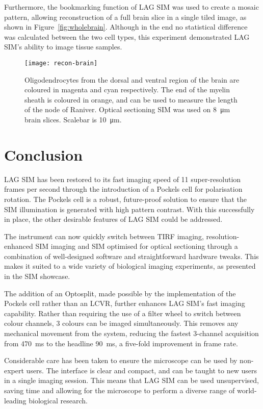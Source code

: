 Furthermore, the bookmarking function of LAG SIM was used to create a mosaic pattern, allowing reconstruction of a full brain slice in a single tiled image, as shown in Figure~\ref{fig:wholebrain}. 
Although in the end no statistical difference was calculated between the two cell types, this experiment demonstrated LAG SIM's ability to image tissue samples. 

\begin{figure}[tbp!]
\centering
\texttt{[image: recon-brain]}
\caption[LAG SIM: Multi-colour optical sectioning SIM to measure the node of Raniver]{Oligodendrocytes from the dorsal and ventral region of the brain are coloured in magenta and cyan respectively. The end of the myelin sheath is coloured in orange, and can be used to measure the length of the node of Raniver. Optical sectioning SIM was used on \SI{8}{\micro\metre} brain slices. Scalebar is \SI{10}{\micro\metre}. }
\label{fig:recon-brain}
\end{figure}

\section{Conclusion}
LAG SIM has been restored to its fast imaging speed of 11 super-resolution frames per second through the introduction of a Pockels cell for polarisation rotation. 
The Pockels cell is a robust, future-proof solution to ensure that the SIM illumination is generated with high pattern contrast. 
With this successfully in place, the other desirable features of LAG SIM could be addressed. 

The instrument can now quickly switch between TIRF imaging, resolution-enhanced SIM imaging and SIM optimised for optical sectioning through a combination of well-designed software and straightforward hardware tweaks. 
This makes it suited to a wide variety of biological imaging experiments, as presented in the SIM showcase. 

The addition of an Optosplit, made possible by the implementation of the Pockels cell rather than an LCVR, further enhances LAG SIM's fast imaging capability. 
Rather than requiring the use of a filter wheel to switch between colour channels, 3 colours can be imaged simultaneously. 
This removes any mechanical movement from the system, reducing the fastest 3-channel acquisition from \SI{470}{\milli\second} to the headline \SI{90}{\milli\second}, a five-fold improvement in frame rate. 

Considerable care has been taken to ensure the microscope can be used by non-expert users. 
The interface is clear and compact, and can be taught to new users in a single imaging session. 
This means that LAG SIM can be used unsupervised, saving time and allowing for the microscope to perform a diverse range of world-leading biological research.

